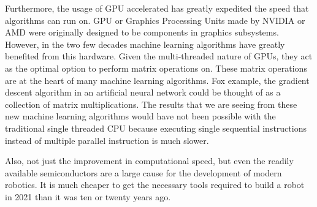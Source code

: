 \documentclass[conference]{IEEEtran}
\begin{document}
Furthermore, the usage of GPU accelerated has greatly expedited the speed that algorithms can run on. GPU or Graphics Processing Units made by NVIDIA or AMD were originally designed to be components in graphics subsystems. However, in the two few decades machine learning algorithms have greatly benefited from this hardware. Given the multi-threaded nature of GPUs, they act as the optimal option to perform matrix operations on\autocite{steinkraus2005using}. These matrix operations are at the heart of many machine learning algorithms. Fox example, the gradient descent algorithm in an artificial neural network could be thought of as a collection of matrix multiplications\autocite{krizhevsky2012imagenet}. The results that we are seeing from these new machine learning algorithms would have not been possible with the traditional single threaded CPU because executing single sequential instructions instead of multiple parallel instruction is much slower. 

Also, not just the improvement in computational speed, but even the readily available semiconductors are a large cause for the development of modern robotics. It is much cheaper to get the necessary tools required to build a robot in 2021 than it was ten or twenty years ago.
\end{document}
